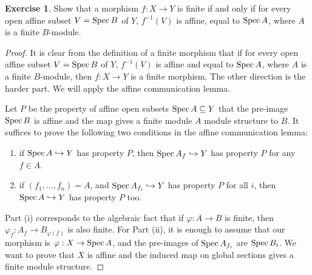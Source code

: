 \documentclass[]{pcmi}
\theoremstyle{plain}
\theoremstyle{definition}
\newtheorem{Exercise}[subsubsection]{Exercise}
\theoremstyle{remark}
\begin{document}
\begin{Exercise}\label{Exercise:2.3.4}
    Show that a morphism $f : X \to Y$ is finite if and only if for every open affine subset $V = \operatorname{Spec} B$ of $Y$, $f^{-1}(V)$ is affine, equal to $\operatorname{Spec} A$, where $A$ is a finite $B$-module. 
\end{Exercise}

\begin{proof}
    It is clear from the definition of a finite morphism that if for every open affine subset $V = \operatorname{Spec} B$ of $Y$, $f^{-1}(V)$ is affine and equal to $\operatorname{Spec} A$, where $A$ is a finite $B$-module, then $f : X \to Y$ is a finite morphism. The other direction is the harder part. We will apply the affine communication lemma. 
    
    Let $P$ be the property of affine open subsets $\operatorname{Spec} A  \subseteq Y$ that the pre-image $\operatorname{Spec} B$ is affine and the map gives a finite module $A$ module structure to $B$. It suffices to prove the following two conditions in the affine communication lemma:
    \begin{enumerate}[label = (\roman*)]
        \item if $\operatorname{Spec} A \hookrightarrow Y$ has property $P$, then $\operatorname{Spec} A_f \hookrightarrow Y$ has property $P$ for any $f \in A$. 
        \item if $(f_1, \ldots, f_n) = A$, and $\operatorname{Spec} A_{f_i} \hookrightarrow Y$ has property $P$ for all $i$, then $\operatorname{Spec} A \hookrightarrow Y$ has property $P$ too. 
    \end{enumerate}
    Part (i) corresponds to the algebraic fact that if $\varphi : A \to B$ is finite, then $\varphi_f : A_f \to B_{\varphi(f)}$ is also finite. For Part (ii), it is enough to assume that our morphism is $\varphi : X \to \operatorname{Spec} A$, and the pre-images of $\operatorname{Spec} A_{f_i}$ are $\operatorname{Spec} B_i$. We want to prove that $X$ is affine and the induced map on global sections gives a finite module structure.
    

\end{proof}
\end{document}
